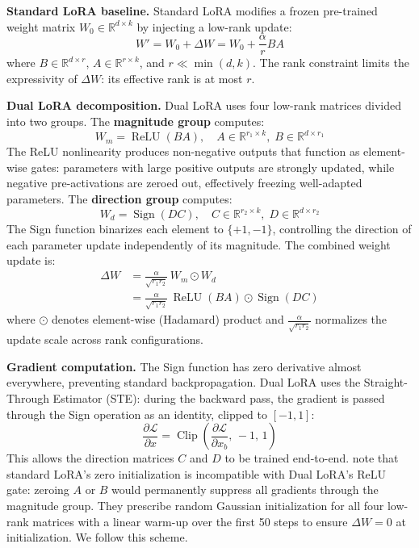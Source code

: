 \documentclass[10pt,twocolumn]{article}
\begin{document}
\textbf{Standard LoRA baseline.} Standard LoRA \cite{hu2022lora} modifies a
frozen pre-trained weight matrix $W_0 \in \mathbb{R}^{d \times k}$ by injecting
a low-rank update:
\begin{equation}
  W' = W_0 + \Delta W = W_0 + \frac{\alpha}{r} BA
  \label{eq:lora}
\end{equation}
where $B \in \mathbb{R}^{d \times r}$, $A \in \mathbb{R}^{r \times k}$, and
$r \ll \min(d, k)$. The rank constraint limits the expressivity of $\Delta W$:
its effective rank is at most $r$.

\textbf{Dual LoRA decomposition.} Dual LoRA uses four low-rank matrices divided
into two groups. The \textbf{magnitude group} computes:
\begin{equation}
  W_m = \operatorname{ReLU}(BA), \quad
  A \in \mathbb{R}^{r_1 \times k},\; B \in \mathbb{R}^{d \times r_1}
  \label{eq:magnitude}
\end{equation}
The ReLU nonlinearity produces non-negative outputs that function as element-wise
gates: parameters with large positive outputs are strongly updated, while negative
pre-activations are zeroed out, effectively freezing well-adapted parameters. The
\textbf{direction group} computes:
\begin{equation}
  W_d = \operatorname{Sign}(DC), \quad
  C \in \mathbb{R}^{r_2 \times k},\; D \in \mathbb{R}^{d \times r_2}
  \label{eq:direction}
\end{equation}
The Sign function binarizes each element to $\{+1, -1\}$, controlling the
direction of each parameter update independently of its magnitude. The combined
weight update is:
\begin{equation}
  \begin{split}
    \Delta W &= \frac{\alpha}{\sqrt{r_1 r_2}}\, W_m \odot W_d \\
             &= \frac{\alpha}{\sqrt{r_1 r_2}}\,
                \operatorname{ReLU}(BA) \odot \operatorname{Sign}(DC)
  \end{split}
  \label{eq:duallora}
\end{equation}
where $\odot$ denotes element-wise (Hadamard) product and
$\frac{\alpha}{\sqrt{r_1 r_2}}$ normalizes the update scale across rank
configurations.

\textbf{Gradient computation.} The Sign function has zero derivative almost
everywhere, preventing standard backpropagation. Dual LoRA uses the
Straight-Through Estimator (STE): during the backward pass, the gradient is
passed through the Sign operation as an identity, clipped to $[-1, 1]$:
\begin{equation}
  \frac{\partial \mathcal{L}}{\partial x}
  = \operatorname{Clip}\!\left(\frac{\partial \mathcal{L}}{\partial x_b},\,-1,\,1\right)
  \label{eq:ste}
\end{equation}
This allows the direction matrices $C$ and $D$ to be trained end-to-end.
\citet{xu2025duallora} note that standard LoRA's zero initialization is
incompatible with Dual LoRA's ReLU gate: zeroing $A$ or $B$ would permanently
suppress all gradients through the magnitude group. They prescribe random
Gaussian initialization for all four low-rank matrices with a linear warm-up
over the first 50 steps to ensure $\Delta W = 0$ at initialization. We follow
this scheme.
\end{document}
